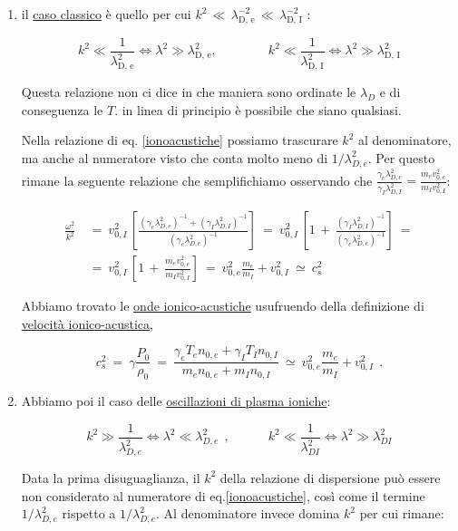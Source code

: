 \begin{enumerate}
	\item il \underline{caso classico} è quello per cui $k^2\,\ll\, \lambda_{\text{D, e}}^{-2}\,\ll\, \lambda_{\text{D, I}}^{-2}$ :
	
	\[k^2\ll\frac{1}{\lambda_{\text{D, e}}^2}\iff\lambda^2\gg\lambda_{\text{D, e}}^2,\qquad\qquad k^2\ll\frac{1}{\lambda_{\text{D, I}}^2}\iff\lambda^2\gg\lambda_{\text{D, I}}^2\] 
	
	Questa relazione non ci dice in che maniera sono ordinate le $\lambda_D$ e di conseguenza le $T$. in linea di principio è possibile che siano qualsiasi.
	
	Nella relazione di eq. \ref{ionoacustiche} possiamo trascurare $k^2$ al denominatore, ma anche al numeratore visto che conta molto meno di $1/\lambda^2_{D,e}$. Per questo rimane la seguente relazione che semplifichiamo osservando che $\frac{\gamma_e \lambda^2_{D,e}}{\gamma_I \lambda^2_{D,I}} = \frac{m_e v^2_{0,e}}{m_I v^2_{0,I}}$:
	
	\[\begin{aligned}
		\frac{\omega^2}{k^2}\ &=\ v^2_{0,I}\, \left[\frac{(\gamma_e \lambda^2_{D,e})^{-1} + (\gamma_I \lambda^2_{D,I})^{-1}}{(\gamma_e \lambda^2_{D,e})^{-1}}\right]\ =\ v^2_{0,I}\, \left[1\, +\, \frac{(\gamma_I \lambda^2_{D,I})^{-1}}{(\gamma_e \lambda^2_{D,e})^{-1}}\right]\ =\\
		&=\ v^2_{0,I}\, \left[1\, +\, \frac{m_e v^2_{0,e}}{m_I v^2_{0,I}} \right]\ =\ v^2_{0,e} \frac{m_e}{m_I} + v^2_{0,I}\ \simeq\ c^2_s
	\end{aligned}\] 
	
	Abbiamo trovato le \underline{onde ionico-acustiche} usufruendo della definizione di \underline{velocità ionico-acustica},
	
	\[c^2_s\ =\ \gamma\frac{P_0}{\rho_0}\ =\ \frac{\gamma_e T_e n_{0,e} + \gamma_I T_I n_{0,I}}{m_e n_{0,e} + m_I n_{0,I}}\ \simeq\ v^2_{0,e} \frac{m_e}{m_I} + v^2_{0,I}\ \ .\]
	
	\item  Abbiamo poi il caso delle \underline{oscillazioni di plasma ioniche}:
	
	\[k^2\gg\frac{1}{\lambda_{D,e}^2}\iff\lambda^2\ll\lambda_{D,e}^2\ \ ,
	\qquad \quad k^2\ll\frac{1}{\lambda_{DI}^2}\iff\lambda^2\gg\lambda_{DI}^2\] 
	
	Data la prima disuguaglianza, il $k^2$ della relazione di dispersione può essere non considerato al numeratore di eq.\ref{ionoacustiche}, così come il termine $1/\lambda^2_{D,e}$ rispetto a $1/\lambda^2_{D,e}$. Al denominatore invece domina $k^2$ per cui rimane:
	

\end{enumerate}
